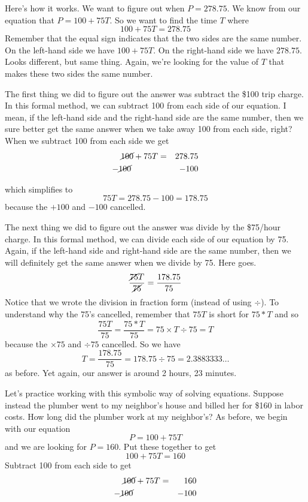 Here's how it works.  We want to figure out when $P=278.75$.  We know from our equation that $P = 100 + 75T$.  So we want to find the time $T$ where  $$100 + 75T=278.75$$  Remember that the equal sign indicates that the two sides are the same number.  On the left-hand side we have $100 + 75T$.  On the right-hand side we have $278.75$.  Looks different, but same thing.  Again, we're looking for the value of $T$ that makes these two sides the same number.  

The first thing we did to figure out the answer was subtract the \$100 trip charge.  In this formal method, we can subtract 100 from each side of our equation.  I mean, if the left-hand side and the right-hand side are the same number, then we sure better get the same answer when we take away 100 from each side, right?  When we subtract 100 from each side we get 
\begin{eqnarray*}
\cancel{100} +75T & = & 278.75\\
-\cancel{100}\hspace{.4in}~& &  -100 \\  %
\end{eqnarray*} 
\vspace{-.5in} %

\noindent which simplifies to $$75T=278.75-100=178.75$$ because the $+100$ and $-100$ cancelled.  

The next thing we did to figure out the answer was divide by the \$75/hour charge.  In this formal method, we can divide each side of our equation by 75.  Again, if the left-hand side and right-hand side are the same number, then we will definitely get the same answer when we divide by 75.  Here goes.
$$\frac{\cancel{75}T}{\cancel{75}}=\frac{178.75}{75} $$
Notice that we wrote the division in fraction form (instead of using $\div$).  To understand why the 75's cancelled, remember that $75T$ is short for $75\ast T$ and so $$\frac{75T}{75} = \frac{75\ast T}{75} = 75 \times T \div 75=T$$ because the $\times 75$ and $\div 75$ cancelled.  So we have $$T = \frac{178.75}{75} = 178.75 \div 75 = 2.3883333\ldots$$ as before.  Yet again, our answer is around 2 hours, 23 minutes.

Let's practice working with this symbolic way of solving equations.  Suppose instead the plumber went to my neighbor's house and billed her for \$160 in labor costs.  How long did the plumber work at my neighbor's?  As before, we begin with our equation $$P = 100 + 75T$$  and we are looking for $P=160$.  Put these together to get $$100+75T =160$$ 
Subtract 100 from each side to get
\begin{eqnarray*}
\cancel{100} +75T & = & 160\\
-\cancel{100}\hspace{.4in}~& &  -100 \\  %
\end{eqnarray*} 
\vspace{-.5in} %

